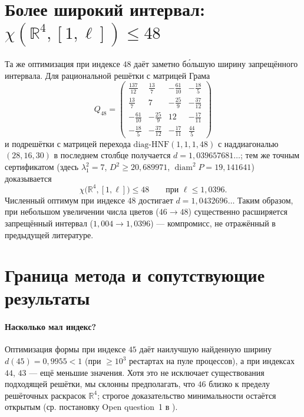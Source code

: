 \documentclass[12pt]{article}
\theoremstyle{definition}
\theoremstyle{remark}
\newcommand{\R}{\mathbb{R}}
\newcommand{\diam}{\operatorname{diam}}
\begin{document}
\section{Более широкий интервал: $\chi(\R^4,[1,\ell])\le48$}\label{sec:wide}

Та же оптимизация при индексе $48$ даёт заметно бо́льшую ширину запрещённого
интервала. Для рациональной решётки с матрицей Грама
\[
Q_{48}=\begin{pmatrix}
\tfrac{137}{12} & \tfrac{13}{7}  & -\tfrac{61}{10} & -\tfrac{18}{5}\\[2pt]
\tfrac{13}{7}   & 7              & -\tfrac{25}{9}  & -\tfrac{37}{12}\\[2pt]
-\tfrac{61}{10} & -\tfrac{25}{9} & 12              & -\tfrac{17}{11}\\[2pt]
-\tfrac{18}{5}  & -\tfrac{37}{12}& -\tfrac{17}{11} & \tfrac{44}{5}
\end{pmatrix}
\]
и подрешётки с матрицей перехода
$\mathrm{diag\text{-}HNF}(1,1,1,48)$ с наддиагональю $(28,16,30)$ в последнем
столбце получается $d=1{,}039657681\ldots$; тем же точным сертификатом
(здесь $\lambda_1^2=7$, $D^2\ge20{,}689971$, $\diam^2 P=19{,}141641$)
доказывается
\[
\chi\bigl(\R^4,[1,\ell]\bigr)\le48\qquad\text{при }\ell\le1{,}0396 .
\]
Численный оптимум при индексе $48$ достигает $d=1{,}0432696\ldots$
Таким образом, при небольшом увеличении числа цветов ($46\to48$) существенно
расширяется запрещённый интервал ($1{,}004\to1{,}0396$) --- компромисс, не
отражённый в предыдущей литературе.

\section{Граница метода и сопутствующие результаты}\label{sec:frontier}

\paragraph{Насколько мал индекс?} Оптимизация формы при индексе $45$ даёт
наилучшую найденную ширину $d(45)=0{,}9955<1$ (при $\ge10^3$ рестартах на
пуле процессов), а при индексах $44$, $43$ --- ещё меньшие значения. Хотя это
не исключает существования подходящей решётки, мы склонны предполагать, что
$46$ близко к пределу решёточных раскрасок $\R^4$; строгое доказательство
минимальности остаётся открытым (ср. постановку Open question~1 в \cite{ABPR}).
\end{document}
